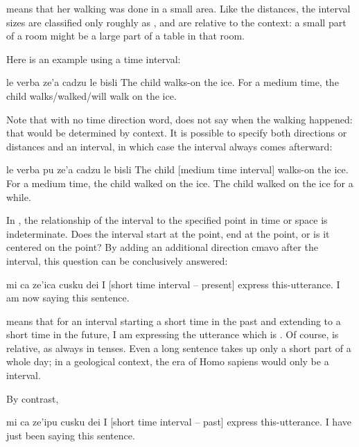 {\noindent}means that her walking was done in a small area. Like the
    distances, the interval sizes are classified only roughly as
    , and are relative to the context: a
    small part of a room might be a large part of a table in that
    room. 

Here is an example using a time interval:
\begin{example}
le verba ze'a cadzu le bisli\n
The child  walks-on the ice.\n
For a medium time, the child walks/walked/will walk\n
\T	on the ice.
\end{example}

Note that with no time direction word,  does not say when the walking happened: that would be
    determined by context. It is possible to specify both
    directions or distances and an interval, in which case the
    interval always comes afterward:
\begin{example}
le verba pu ze'a\n
\T	cadzu le bisli\n
The child  [medium time interval]\n
\T	walks-on the ice.\n
For a medium time, the child walked on the ice.\n
The child walked on the ice for a while.
\end{example}

In , the relationship of the
    interval to the specified point in time or space is
    indeterminate. Does the interval start at the point, end at the
    point, or is it centered on the point? By adding an additional
    direction cmavo after the interval, this question can be
    conclusively answered:
\begin{example}
mi ca ze'ica cusku dei\n
I  [short time interval -- present]\n
\T	express this-utterance.\n
I am now saying this sentence.
\end{example}

{\noindent}means that for an interval starting a short time in the past
    and extending to a short time in the future, I am expressing
    the utterance which is . Of
    course,  is relative, as always in tenses. Even a long
    sentence takes up only a short part of a whole day; in a
    geological context, the era of Homo sapiens would only be a
     interval. 

By contrast,
\begin{example}
mi ca ze'ipu\n
\T	cusku dei\n
I  [short time interval -- past]\n
\T	express this-utterance.\n
I have just been saying this sentence.
\end{example}

